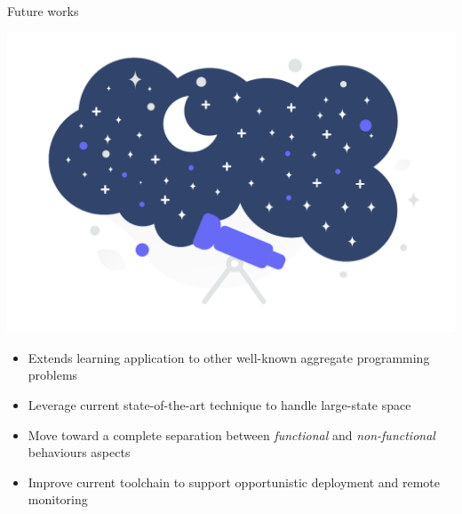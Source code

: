 \begin{frame}{Future works}
  \begin{backgroundblock} 
    \includegraphics[width=\paperwidth]{img/conclusion} 
  \end{backgroundblock} 
  \begin{card}
    \begin{itemize}
      \item Extends learning application to other well-known aggregate programming problems
      \item Leverage current state-of-the-art technique to handle large-state space
    \end{itemize}
  \end{card}
  \begin{card}
    \begin{itemize}
      \item Move toward a complete separation between \textit{functional} and \textit{non-functional} behaviours aspects
      \item Improve current toolchain to support opportunistic deployment and remote monitoring
    \end{itemize}
  \end{card}
\end{frame}